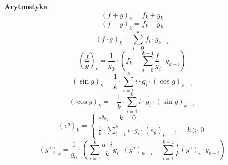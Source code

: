 \documentclass[../mn-notatki.tex]{subfiles}
\begin{document}
\begin{tcolorbox}
\textbf{Arytmetyka}
    $$(f + g)_k  = f_k + g_k$$
    $$(f - g)_k  = f_k - g_k$$
    $$(f \cdot g)_k  = \sum_{i=0}^{k} f_i \cdot g_{k-i}$$
    $$\left(\frac{f}{g}\right)_k  = \frac{1}{g_0} \cdot \left( f_k - \sum_{i=0}^{k-1} \frac{f}{g}_{i} \cdot g_{k-i} \right)$$
    $$(\sin g)_k = \frac{1}{k} \cdot \sum_{i=1}^{k} i \cdot g_i \cdot (\cos g)_{k-1}$$
    $$(\cos g)_k = -\frac{1}{k} \cdot \sum_{i=1}^{k} i \cdot g_i \cdot (\sin g)_{k-1}$$
    $$
    (e^g)_k =
    \begin{cases}
    e^{g_0}, ~~~~~~ k = 0\\
    \frac{1}{k} \cdot \sum_{i=1}^{k} i \cdot g_i \cdot \left(e_g\right)_{k-1},~~~~~~ k >0
    \end{cases}
    $$
    $$
    (g^a)_k =  \frac{1}{g_0} \cdot \left( \sum_{i=1}^{k} \frac{a\cdot i}{k}g_i \cdot (g^a)_{k-i}- \sum_{i=1}^{k-1} \frac{i}{k} (g^a)_i \cdot g_{k-i}\right)
    $$
\end{tcolorbox}

\pagebreak
\end{document}
